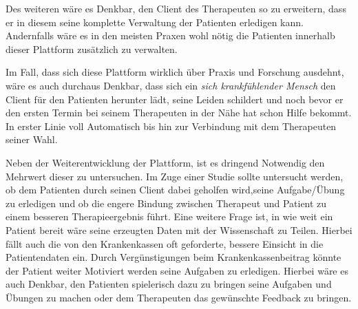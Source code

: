 Des weiteren wäre es Denkbar, den Client des Therapeuten so zu erweitern, dass er in diesem seine komplette Verwaltung der Patienten erledigen kann. Andernfalls wäre es in den meisten Praxen wohl nötig die Patienten innerhalb dieser Plattform zusätzlich zu verwalten. 

Im Fall, dass sich diese Plattform wirklich über Praxis und Forschung ausdehnt, wäre es auch durchaus Denkbar, dass sich ein \textit{sich krankfühlender Mensch} den Client für den Patienten herunter lädt, seine Leiden schildert und noch bevor er den ersten Termin bei seinem Therapeuten in der Nähe hat schon Hilfe bekommt. In erster Linie voll Automatisch bis hin zur Verbindung mit dem Therapeuten seiner Wahl.

Neben der Weiterentwicklung der Plattform, ist es dringend Notwendig den Mehrwert dieser zu untersuchen. Im Zuge einer Studie sollte untersucht werden, ob dem Patienten durch seinen Client dabei geholfen wird,seine Aufgabe/Übung zu erledigen und ob die engere Bindung zwischen Therapeut und Patient zu einem besseren Therapieergebnis führt.
Eine weitere Frage ist, in wie weit ein Patient bereit wäre seine erzeugten Daten mit der Wissenschaft zu Teilen. Hierbei fällt auch die von den Krankenkassen oft geforderte, bessere Einsicht in die Patientendaten ein. Durch Vergünstigungen beim Krankenkassenbeitrag könnte der Patient weiter Motiviert werden seine Aufgaben zu erledigen. Hierbei wäre es auch Denkbar, den Patienten spielerisch dazu zu bringen seine Aufgaben und Übungen zu machen oder dem Therapeuten das gewünschte Feedback zu bringen.
